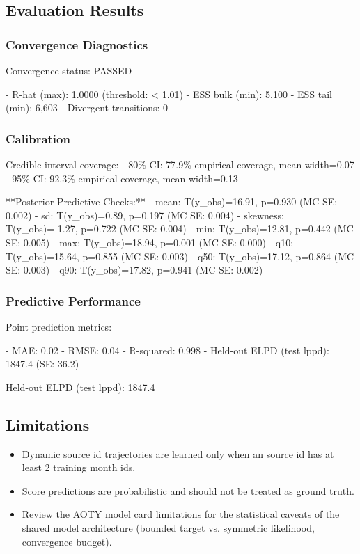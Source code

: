 \documentclass{article}
\begin{document}
\subsection*{Evaluation Results}

\subsubsection*{Convergence Diagnostics}
Convergence status: PASSED

- R-hat (max): 1.0000 (threshold: < 1.01)
- ESS bulk (min): 5,100
- ESS tail (min): 6,603
- Divergent transitions: 0

\subsubsection*{Calibration}
Credible interval coverage:
- 80\% CI: 77.9\% empirical coverage, mean width=0.07
- 95\% CI: 92.3\% empirical coverage, mean width=0.13

**Posterior Predictive Checks:**
- mean: T(y\_obs)=16.91, p=0.930 (MC SE: 0.002)
- sd: T(y\_obs)=0.89, p=0.197 (MC SE: 0.004)
- skewness: T(y\_obs)=-1.27, p=0.722 (MC SE: 0.004)
- min: T(y\_obs)=12.81, p=0.442 (MC SE: 0.005)
- max: T(y\_obs)=18.94, p=0.001 (MC SE: 0.000)
- q10: T(y\_obs)=15.64, p=0.855 (MC SE: 0.003)
- q50: T(y\_obs)=17.12, p=0.864 (MC SE: 0.003)
- q90: T(y\_obs)=17.82, p=0.941 (MC SE: 0.002)

\subsubsection*{Predictive Performance}
Point prediction metrics:

- MAE: 0.02
- RMSE: 0.04
- R-squared: 0.998
- Held-out ELPD (test lppd): 1847.4 (SE: 36.2)

Held-out ELPD (test lppd): 1847.4

\subsection*{Limitations}
\begin{itemize}
  \item Dynamic source id trajectories are learned only when an source id has at least 2 training month ids.
  \item Score predictions are probabilistic and should not be treated as ground truth.
  \item Review the AOTY model card limitations for the statistical caveats of the shared model architecture (bounded target vs. symmetric likelihood, convergence budget).
\end{itemize}
\end{document}
